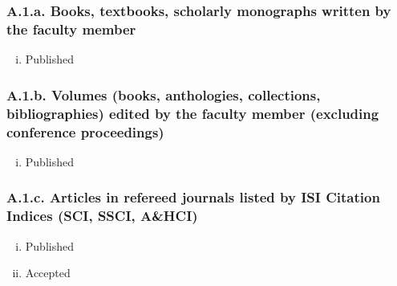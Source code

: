 \documentclass[12pt]{article}
\begin{document}
\subsubsection*{A.1.a. Books, textbooks, scholarly monographs written by the faculty member}


\begin{enumerate}[i)]
\item Published  %
\end{enumerate}


\subsubsection*{A.1.b. Volumes (books, anthologies, collections, bibliographies) edited by the faculty member (excluding conference proceedings)}


\begin{enumerate}[i)]
\item Published 
\end{enumerate}

\subsubsection*{A.1.c. Articles in refereed journals listed by ISI Citation Indices (SCI, SSCI, A\&HCI)}

%

\begin{enumerate}[i)]
\item Published %

\item Accepted %
\end{enumerate}
\end{document}
